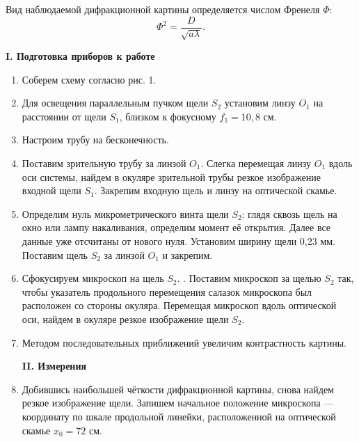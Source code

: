 \documentclass[a4paper,12pt]{article} %
\begin{document}
	Вид наблюдаемой дифракционной картины определяется числом Френеля $\Phi$:
	\begin{equation*}
		\Phi ^2 = \frac{D}{\sqrt{a\lambda}}.
	\end{equation*}
	
	\begin{center}
		\textbf{I. Подготовка приборов к работе}
	\end{center}

	\begin{enumerate}
		\item Соберем схему согласно рис. 1.
		
		\item Для освещения параллельным пучком щели $S_2$ установим линзу $O_1$ на расстоянии от щели $S_1$, близком к фокусному $f_1 = 10,8$ см.
		
		\item Настроим трубу на бесконечность.

		
		\item Поставим зрительную трубу за линзой $O_1$.
		Слегка перемещая линзу $O_1$ вдоль оси системы, найдем в окуляре зрительной трубы резкое изображение входной щели $S_1$. Закрепим входную щель и линзу на оптической скамье.
		
		\item Определим нуль микрометрического винта щели $S_2$: глядя сквозь щель на окно или лампу накаливания, определим момент её открытия. Далее все данные уже отсчитаны от нового нуля. Установим ширину щели 0,23 мм. Поставим щель $S_2$ за линзой $O_1$ и закрепим.
		
		\item Сфокусируем микроскоп на щель $S_2$. . Поставим микроскоп за щелью $S_2$ так, чтобы указатель продольного перемещения салазок микроскопа был расположен со стороны окуляра. Перемещая микроскоп вдоль оптической оси, найдем в окуляре резкое изображение щели $S_2$.
		
		\item Методом последовательных приближений увеличим контрастность картины.
		
		
		\begin{center}
			\textbf{II. Измерения}
		\end{center}
		
		\item Добившись наибольшей чёткости дифракционной картины, снова найдем резкое изображение щели. Запишем начальное положение микроскопа — координату по шкале продольной линейки, расположенной на оптической скамье $x_0 = 72$ см.
		

\end{enumerate}
\end{document}

